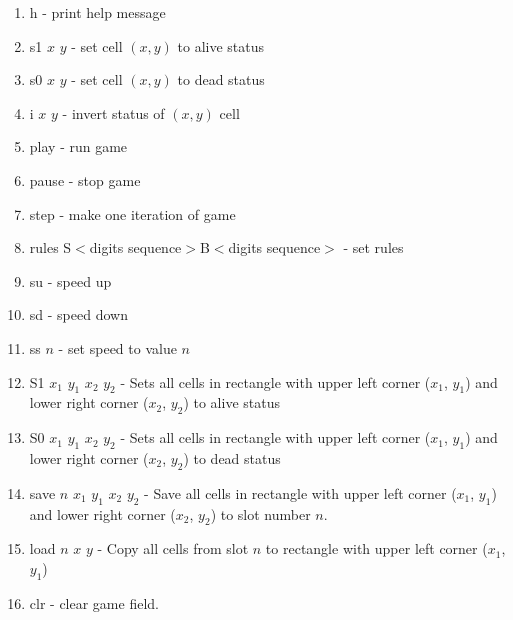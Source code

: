 \begin{enumerate}
	\item \textsf{h} - print help message
	\item \textsf{s1 $x$ $y$} - set cell $(x, y)$ to alive status
	\item \textsf{s0 $x$ $y$} - set cell $(x, y)$ to dead status
	\item \textsf{i $x$ $y$} - invert status of $(x, y)$ cell
	\item \textsf{play} - run game
	\item \textsf{pause} - stop game
	\item \textsf{step} - make one iteration of game
	\item \textsf{rules S$<$digits sequence$>$B$<$digits sequence$>$} - set rules
	\item \textsf{su} - speed up
	\item \textsf{sd} - speed down
	\item \textsf{ss $n$} - set speed to value $n$
	\item \textsf{S1 $x_{1}$ $y_{1}$ $x_{2}$ $y_{2}$} -  Sets all cells in rectangle with upper left corner ($x_{1}$, $y_{1}$) and lower right corner ($x_{2}$, $y_{2}$) to alive status
	\item \textsf{S0 $x_{1}$ $y_{1}$ $x_{2}$ $y_{2}$} -  Sets all cells in rectangle with upper left corner ($x_{1}$, $y_{1}$) and lower right corner ($x_{2}$, $y_{2}$) to dead status
	\item \textsf{save $n$ $x_{1}$ $y_{1}$ $x_{2}$ $y_{2}$} - Save all cells in rectangle with upper left corner ($x_{1}$, $y_{1}$) and lower right corner ($x_{2}$, $y_{2}$) to slot number $n$.
	\item \textsf{load $n$ $x$ $y$} - Copy all cells from slot $n$ to rectangle with upper left corner ($x_{1}$, $y_{1}$)
	\item \textsf{clr} - clear game field.
\end{enumerate}
